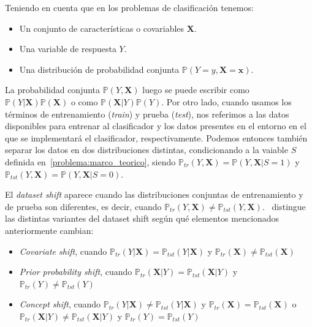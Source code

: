 Teniendo en cuenta que en los problemas de clasificación tenemos:

\begin{itemize}
    \item Un conjunto de características o covariables $\boldsymbol{X}$.
    \item Una variable de respuesta $Y$.
    \item Una distribución de probabilidad conjunta
    $\mathbb{P}(Y=y,\boldsymbol{X=x})$.
\end{itemize}

La probabilidad conjunta $\mathbb{P}(Y,\boldsymbol{X})$ luego se puede escribir
como $\mathbb{P}(Y|\boldsymbol{X})\mathbb{P}(\boldsymbol{X})$ o como
$\mathbb{P}(\boldsymbol{X}|Y)\mathbb{P}(Y)$. Por otro lado, cuando usamos los
términos de entrenamiento ({\it train\/}) y prueba ({\it test\/}), nos referimos
a las datos disponibles para entrenar al clasificador y los datos presentes en
el entorno en el que se implementará el clasificador, respectivamente. Podemos
entonces también separar los datos en dos distribuciones distintas,
condicionando a la vaiable $S$ definida en~\ref{problema:marco_teorico}, siendo
$\mathbb{P}_{tr}(Y,\boldsymbol{X})=\mathbb{P}(Y,\boldsymbol{X}|S=1)$ y
$\mathbb{P}_{tst}(Y,\boldsymbol{X})=\mathbb{P}(Y,\boldsymbol{X}|S=0)$.

El {\it dataset shift\/} aparece cuando las distribuciones conjuntas de
entrenamiento y de prueba son diferentes, es decir, cuando
$\mathbb{P}_{tr}(Y,\boldsymbol{X}) \neq
\mathbb{P}_{tst}(Y,\boldsymbol{X})$.~\citet{moreno2012unifying} distingue las
distintas variantes del dataset shift según qué elementos mencionados
anteriormente cambian:

\begin{itemize}
    \item {\it Covariate shift}, cuando $\mathbb{P}_{tr}(Y|\boldsymbol{X}) =
    \mathbb{P}_{tst}(Y|\boldsymbol{X})$ y $\mathbb{P}_{tr}(\boldsymbol{X}) \neq
    \mathbb{P}_{tst}(\boldsymbol{X})$
    \item {\it Prior probability shift}, cuando
    $\mathbb{P}_{tr}(\boldsymbol{X}|Y) = \mathbb{P}_{tst}(\boldsymbol{X}|Y)$ y
    $\mathbb{P}_{tr}(Y) \neq \mathbb{P}_{tst}(Y)$
    \item {\it Concept shift}, cuando $\mathbb{P}_{tr}(Y|\boldsymbol{X}) \neq
    \mathbb{P}_{tst}(Y|\boldsymbol{X})$ y $\mathbb{P}_{tr}(\boldsymbol{X}) =
    \mathbb{P}_{tst}(\boldsymbol{X})$ o $\mathbb{P}_{tr}(\boldsymbol{X}|Y) \neq
    \mathbb{P}_{tst}(\boldsymbol{X}|Y)$ y $\mathbb{P}_{tr}(Y) =
    \mathbb{P}_{tst}(Y)$
\end{itemize}

